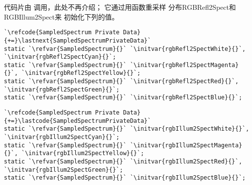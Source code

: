 代码片由\linebreak
{}调用，此处不再介绍；
它通过用函数\linebreak{}重采样
分布{\ttfamily RGBRefl2Spect}和{\ttfamily RGBIllum2Spect}来
初始化下列的值。
\begin{lstlisting}
`\refcode{SampledSpectrum Private Data}{+=}\lastnext{SampledSpectrumPrivateData}`
static `\refvar{SampledSpectrum}{}` `\initvar{rgbRefl2SpectWhite}{}`, `\initvar{rgbRefl2SpectCyan}{}`;
static `\refvar{SampledSpectrum}{}` `\initvar{rgbRefl2SpectMagenta}{}`, `\initvar{rgbRefl2SpectYellow}{}`;
static `\refvar{SampledSpectrum}{}` `\initvar{rgbRefl2SpectRed}{}`, `\initvar{rgbRefl2SpectGreen}{}`;
static `\refvar{SampledSpectrum}{}` `\initvar{rgbRefl2SpectBlue}{}`;
\end{lstlisting}
\begin{lstlisting}
`\refcode{SampledSpectrum Private Data}{+=}\lastcode{SampledSpectrumPrivateData}`
static `\refvar{SampledSpectrum}{}` `\initvar{rgbIllum2SpectWhite}{}`, `\initvar{rgbIllum2SpectCyan}{}`;
static `\refvar{SampledSpectrum}{}` `\initvar{rgbIllum2SpectMagenta}{}`, `\initvar{rgbIllum2SpectYellow}{}`;
static `\refvar{SampledSpectrum}{}` `\initvar{rgbIllum2SpectRed}{}`, `\initvar{rgbIllum2SpectGreen}{}`;
static `\refvar{SampledSpectrum}{}` `\initvar{rgbIllum2SpectBlue}{}`;
\end{lstlisting}
